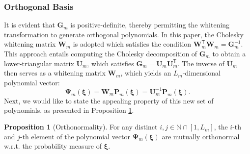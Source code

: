 \documentclass[journal]{IEEEtran}
\theoremstyle{definition}
\newtheorem{prop}{Proposition}
\theoremstyle{remark}
\begin{document}
\subsubsection{Orthogonal Basis}
It is evident that $\boldsymbol{G}_m$ is positive-definite, thereby permitting the whitening transformation to generate orthogonal polynomials. 
In this paper, the Cholesky whitening matrix $\boldsymbol{W}_m$ is adopted which satisfies the condition $\boldsymbol{W}_m^{\mathsf{T}}\boldsymbol{W}_m=\boldsymbol{G}_m^{-1}$. This approach entails computing the Cholesky decomposition of $\boldsymbol{G}_m$ to obtain a lower-triangular matrix $\boldsymbol{U}_m$, which satisfies $\boldsymbol{G}_m=\boldsymbol{U}_m\boldsymbol{U}_m^\mathsf{T}$. The inverse of $\boldsymbol{U}_m$ then serves as a whitening matrix $\boldsymbol{W}_m$, which yields an $L_{m}$-dimensional polynomial vector:
\begin{equation}\label{eq:13}
    \boldsymbol{\Psi}_m(\boldsymbol{\xi})=\boldsymbol{W}_m\boldsymbol{P}_m(\boldsymbol{\xi})=\boldsymbol{U}_m^{-1}\boldsymbol{P}_m(\boldsymbol{\xi}).
\end{equation}
Next, we would like to state the appealing property of this new set of polynomials, as presented in Proposition \ref{prop:1}.
\begin{prop}[Orthonormality]\label{prop:1}
For any distinct $i,j\in\mathbb{N}\cap[1,L_{m}]$, the $i$-th and $j$-th element of the polynomial vector $\boldsymbol{\Psi}_m(\boldsymbol{\xi})$ are mutually orthonormal w.r.t. the probability measure of $\boldsymbol{\xi}$.
\end{prop}
\end{document}
